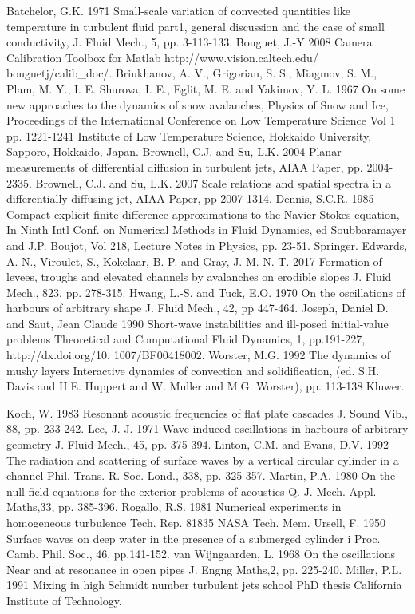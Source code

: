 \documentclass[12pt,a4paper]{article}
\begin{document}
Batchelor, G.K. 1971 Small-scale variation of convected quantities like temperature in turbulent fluid part1, general discussion and the case of small conductivity, J. Fluid Mech., 5, pp. 3-113-133.
Bouguet, J.-Y 2008 Camera Calibration Toolbox for Matlab http://www.vision.caltech.edu/ bouguetj/calib_doc/.
Briukhanov, A. V., Grigorian, S. S., Miagmov, S. M., Plam, M. Y., I. E. Shurova, I. E., Eglit, M. E. and Yakimov, Y. L. 1967 On some new approaches to the dynamics of snow avalanches, Physics of Snow and Ice, Proceedings of the International Conference on Low Temperature Science Vol 1 pp. 1221-1241 Institute of Low Temperature Science, Hokkaido University, Sapporo, Hokkaido, Japan.
Brownell, C.J. and Su, L.K. 2004 Planar measurements of differential diffusion in turbulent jets, AIAA Paper, pp. 2004-2335.
Brownell, C.J. and Su, L.K. 2007 Scale relations and spatial spectra in a differentially diffusing jet, AIAA Paper, pp 2007-1314.
Dennis, S.C.R. 1985 Compact explicit finite difference approximations to the Navier-Stokes equation, In Ninth Intl Conf. on Numerical Methods in Fluid Dynamics, ed Soubbaramayer and J.P. Boujot, Vol 218, Lecture Notes in Physics, pp. 23-51. Springer.
Edwards, A. N., Viroulet, S., Kokelaar, B. P. and Gray, J. M. N. T. 2017 Formation of levees, troughs and elevated channels by avalanches on erodible slopes J. Fluid Mech., 823, pp. 278-315.
Hwang, L.-S. and Tuck, E.O. 1970 On the oscillations of harbours of arbitrary shape J. Fluid Mech., 42, pp 447-464.
Joseph, Daniel D. and Saut, Jean Claude 1990 Short-wave instabilities and ill-posed initial-value problems Theoretical and Computational Fluid Dynamics, 1, pp.191-227, http://dx.doi.org/10. 1007/BF00418002.
Worster, M.G. 1992 The dynamics of mushy layers Interactive dynamics of convection and solidification, (ed. S.H. Davis and H.E. Huppert and W. Muller and M.G. Worster), pp. 113-138 Kluwer.

Koch, W. 1983 Resonant acoustic frequencies of flat plate cascades J. Sound Vib., 88, pp. 233-242.
Lee, J.-J. 1971 Wave-induced oscillations in harbours of arbitrary geometry J. Fluid Mech., 45, pp. 375-394.
Linton, C.M. and Evans, D.V. 1992 The radiation and scattering of surface waves by a vertical circular cylinder in a channel Phil. Trans. R. Soc. Lond., 338, pp. 325-357.
Martin, P.A. 1980 On the null-field equations for the exterior problems of acoustics Q. J. Mech. Appl. Maths,33, pp. 385-396.
Rogallo, R.S. 1981 Numerical experiments in homogeneous turbulence Tech. Rep. 81835 NASA Tech. Mem.
Ursell, F. 1950 Surface waves on deep water in the presence of a submerged cylinder i Proc. Camb. Phil. Soc., 46, pp.141-152.
van Wijngaarden, L. 1968 On the oscillations Near and at resonance in open pipes J. Engng Maths,2, pp. 225-240.
Miller, P.L. 1991 Mixing in high Schmidt number turbulent jets school PhD thesis California Institute of Technology.
\end{document}
